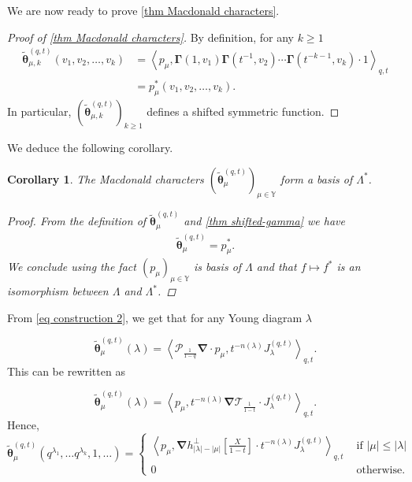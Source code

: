 \documentclass[12pt]{amsart}
\newtheorem{cor}[thm]{Corollary}
\theoremstyle{remark}
\newcommand{\Mch}{\boldsymbol{\widetilde\theta}^{(q,t)}}
\newcommand{\J}{{J}^{(q,t)}}
\newcommand{\nablaJ}{\boldsymbol{\nabla}}
\newcommand{\GammaJ}{\boldsymbol{\Gamma}}
\newcommand{\Pop}{\mathcal{P}}
\newcommand{\Top}{\mathcal{T}}
\begin{document}
We are now ready to prove \cref{thm Macdonald characters}.
\begin{proof}[Proof of \cref{thm Macdonald characters}]
    By definition, for any $k\geq1$ 
    \begin{align*}
      \Mch_{\mu,k}(v_1,v_2,\dots,v_k)
      &=\left\langle p_\mu,\GammaJ(1,v_1)\GammaJ(t^{-1},v_2)\cdots \GammaJ(t^{-{k-1}},v_k) \cdot 1\right\rangle_{q,t}\\
      &=p_\mu^*(v_1,v_2,\dots,v_k).
    \end{align*}
    In particular, $(\Mch_{\mu,k})_{k\geq 1}$  defines a shifted symmetric function. 
\end{proof}

We deduce the following corollary.
\begin{cor}\label{cor char basis}
The Macdonald characters $(\Mch_\mu)_{\mu\in\mathbb Y}$ form a basis of $\Lambda^*$. 
\begin{proof}
From the definition of $\Mch_\mu$ and \cref{thm shifted-gamma} we have 
\begin{align}\label{eq Mch-p_mu^*}
    \Mch_{\mu}=p_\mu^*.
\end{align}
We conclude using the fact $(p_\mu)_{\mu\in\mathbb Y}$ is basis of $\Lambda$ and that $f\longmapsto f^*$ is an isomorphism between $\Lambda$ and $\Lambda^*$. 
\end{proof}
\end{cor}

From \cref{eq construction 2}, we get that for any Young diagram $\lambda$

\begin{equation}
    \Mch_\mu(\lambda)=\left\langle\Pop_{\frac{1}{1-q}}\nablaJ\cdot p_\mu,t^{-n(\lambda)}\J_\lambda\right\rangle _{q,t}.
\end{equation}
This can be rewritten as

\begin{equation*}
     \Mch_\mu(\lambda)=\left\langle p_\mu,t^{-n(\lambda)}\nablaJ\Top_{\frac{1}{1-t}}\cdot \J_\lambda\right\rangle _{q,t}.
\end{equation*}
Hence,
\begin{equation}\label{eq characters J}
  \Mch_\mu(q^{\lambda_1},\dots q^{\lambda_k},1,\dots)=\left\{
\begin{array}{cc}
     \left\langle p_\mu, \nablaJ h^\perp_{|\lambda|-|\mu|}\left[\frac{X}{1-t}\right]\cdot t^{-n(\lambda)}J^{(q,t)}_\lambda\right\rangle_{q,t} & \text{ if } |\mu|\leq |\lambda| \\
    0  & \text{ otherwise.}
\end{array}\right.  
\end{equation}
\end{document}
